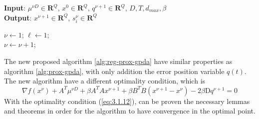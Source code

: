    \newpage
    \begin{algorithm}[H]
        \caption{The Regulated Proximal Primal Dual Algorithm (R-Prox-GPDA)}\label{alg:reg-prox-gpda}
        \textbf{Input}: $\mu^{\nu D} \in \mathbf{R}^{Q}$, $x^0 \in \mathbf{R}^Q$, $q^{\nu + 1} \in \mathbf{R}^Q$, $D, T, d_{max}, \beta$\\
        \textbf{Output}: $x^{\nu +1} \in \mathbf{R}^Q$, $s_i^{\nu} \in \mathbf{R}^Q$
        \begin{algorithmic}[1]
            \State $\nu \gets 1$;
            \State $\ell \gets 1$;\\
            $\nu \gets \nu + 1$;
        \end{algorithmic}
    \end{algorithm}

    The new proposed algorithm \ref{alg:reg-prox-gpda} have similar properties as algorithm \ref{alg:prox-gpda}, with only addition the error position variable $q(t)$. The new algorithm have a different optimality condition, which is
    \begin{equation}\label{eq:3.1.12}
        \nabla f(x^{\nu}) + A^T\mu^{\nu D} + \beta A^TAx^{\nu + 1} + \beta B^TB(x^{\nu + 1} - x^{\nu}) - 2\beta \mathrm{D}q^{\nu + 1} = 0
    \end{equation}
    With the optimality condition (\ref{eq:3.1.12}), can be proven the necessary lemmas and theorems in order for the algorithm to have convergence in the optimal point.

